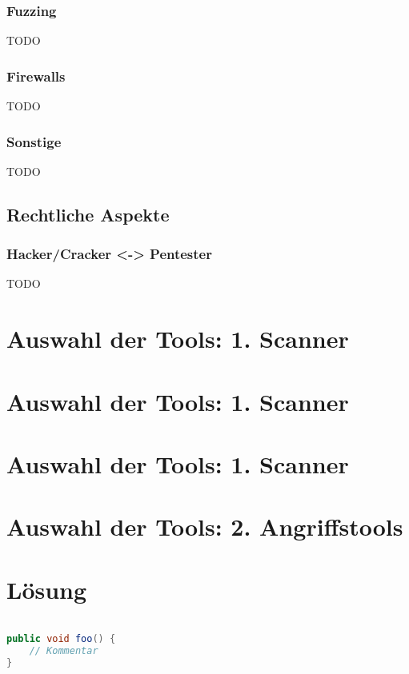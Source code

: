 \documentclass[12pt,oneside,a4paper,parskip]{scrbook}
\begin{document}
\subsection{Fuzzing}
TODO

\subsection{Firewalls}
TODO

\subsection{Sonstige}
TODO

\section{Rechtliche Aspekte}
\subsection{Hacker/Cracker <-> Pentester}

TODO







\chapter{Auswahl der Tools: 1. Scanner}
\chapter{Auswahl der Tools: 1. Scanner}
\chapter{Auswahl der Tools: 1. Scanner}
\chapter{Auswahl der Tools: 2. Angriffstools}

\chapter{Lösung}

\begin{lstlisting}[label=lst:java,
				   language=java,
				   firstnumber=1,
				   caption=Beispiel für einen Quelltext]

public void foo() {
	// Kommentar
}
\end{lstlisting}
\end{document}
